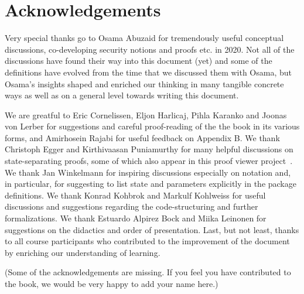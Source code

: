 \section{Acknowledgements}
Very special thanks go to Osama Abuzaid for tremendously useful conceptual discussions, co-developing security notions and proofs etc. in 2020. Not all of the discussions have found their way into this document (yet) and some of the definitions have evolved from the time that we discussed them with Osama, but Osama's insights shaped and enriched our thinking in many tangible concrete ways as well as on a general level towards writing this document.

We are greatful to Eric Cornelissen, Eljon Harlicaj, Pihla Karanko and Joonas von Lerber for suggestions and careful proof-reading of the the book in its various forms, and Amirhosein Rajabi for useful feedback on Appendix B. We thank Christoph Egger and Kirthivaasan Puniamurthy for many helpful discussions on state-separating proofs, some of which also appear in this proof viewer project~\cite{ACNS:BEP24}. We thank Jan Winkelmann for inspiring discussions especially on notation and, in particular, for suggesting to list state and parameters explicitly in the package definitions. We thank Konrad Kohbrok and Markulf Kohlweiss for useful discussions and suggestions regarding the code-structuring and further formalizations. We thank Estuardo Alpirez Bock and Miika Leinonen for suggestions on the didactics and order of presentation. Last, but not least, thanks to all course participants who contributed to the improvement of the document by enriching our understanding of learning.

(Some of the acknowledgements are missing. If you feel you have contributed to the book, we would be very happy to add your name here.)